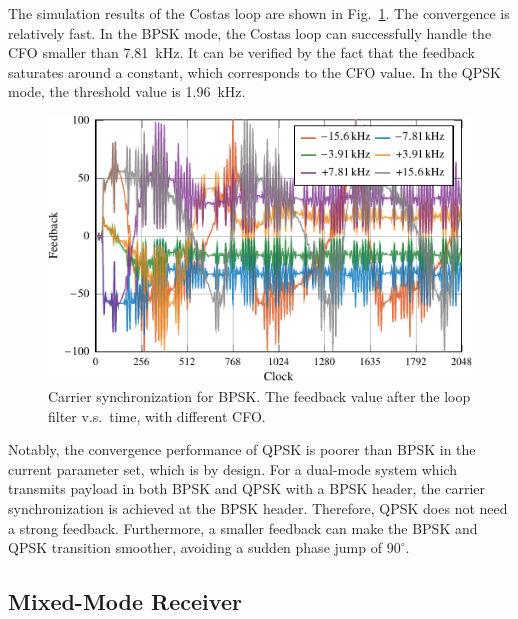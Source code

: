 \documentclass[journal,twoside]{IEEEtran}
\begin{document}
      The simulation results of the Costas loop are shown in Fig.~\ref{fig:sync_BPSK}.
      The convergence is relatively fast.
      In the BPSK mode, the Costas loop can successfully handle the CFO smaller than \qty{7.81}{kHz}.
      It can be verified by the fact that the feedback saturates around a constant,
      which corresponds to the CFO value.
      In the QPSK mode, the threshold value is \qty{1.96}{kHz}.
      \begin{figure}[htbp]
        \centering
        \includegraphics{_tikz_sim_sync_BPSK-crop.pdf}
        \caption{Carrier synchronization for BPSK. The feedback value after the loop filter v.s.\ time, with different CFO.}
        \label{fig:sync_BPSK}
      \end{figure}
      
      Notably, the convergence performance of QPSK is poorer than BPSK in the current parameter set,
      which is by design.
      For a dual-mode system which transmits payload in both BPSK and QPSK with a BPSK header,
      the carrier synchronization is achieved at the BPSK header.
      Therefore, QPSK does not need a strong feedback.
      Furthermore, a smaller feedback can make the BPSK and QPSK transition smoother,
      avoiding a sudden phase jump of $90^\circ$.

    \subsection{Mixed-Mode Receiver}
\end{document}
